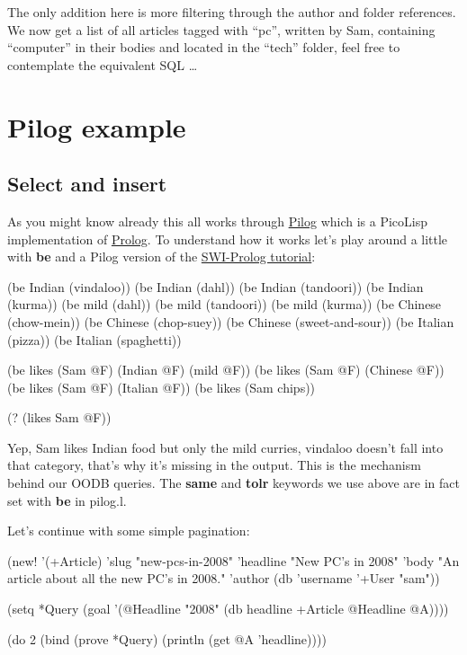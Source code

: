 The only addition here is more filtering through the author and folder
references. We now get a list of all articles tagged with ``pc'', written
by Sam, containing ``computer'' in their bodies and located in the ``tech''
folder, feel free to contemplate the equivalent SQL \dots{}

\section{Pilog example}
\label{sec:advanced-oodb}

\subsection{Select and insert}
\label{sec:advanced-oodb}

As you might know already this all works through
\href{http://www.software-lab.de/ref.html#pilog}{Pilog} which is a
PicoLisp implementation of
\href{http://en.wikipedia.org/wiki/Prolog}{Prolog}. To understand how
it works let's play around a little with \textbf{be} and a Pilog
version of the
\href{http://www.swi-prolog.org/documentation.html}{SWI-Prolog
  tutorial}:


\begin{wideverbatim}
(be Indian (vindaloo))
(be Indian (dahl))
(be Indian (tandoori))
(be Indian (kurma))
(be mild (dahl))
(be mild (tandoori))
(be mild (kurma))
(be Chinese (chow-mein))
(be Chinese (chop-suey))
(be Chinese (sweet-and-sour))
(be Italian (pizza))
(be Italian (spaghetti))

(be likes (Sam @F) (Indian @F) (mild @F))
(be likes (Sam @F) (Chinese @F))
(be likes (Sam @F) (Italian @F))
(be likes (Sam chips))

(? (likes Sam @F))
\end{wideverbatim}

Yep, Sam likes Indian food but only the mild curries, vindaloo doesn't
fall into that category, that's why it's missing in the output. This
is the mechanism behind our OODB queries. The \textbf{same} and
\textbf{tolr} keywords we use above are in fact set with \textbf{be}
in pilog.l.

Let's continue with some simple pagination:

\begin{wideverbatim}
(new! '(+Article) 'slug "new-pcs-in-2008" 'headline "New PC's in 2008" 
'body "An article about all the new PC's in 2008." 'author (db 'username '+User "sam"))

(setq *Query (goal '(@Headline "2008" (db headline +Article @Headline @A))))

(do 2 (bind (prove *Query) (println (get @A 'headline))))
\end{wideverbatim}

